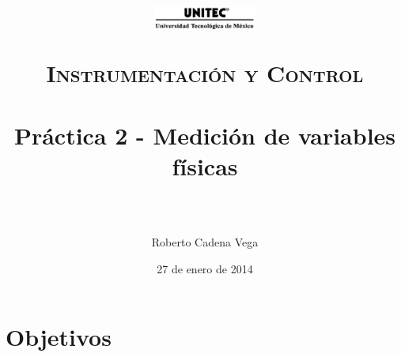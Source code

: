 



\title{	
	\normalfont \normalsize
	\begin{figure}[h]
		\begin{center}
			\includegraphics[width=0.3\textwidth]{../../images/UNITEC.png} %
		\end{center}
	\end{figure}
	\textsc{Instrumentación y Control} \\ [25pt]
	\horrule{0.5pt} \\[0.4cm] %
	\huge Práctica 2 - Medición de variables físicas \\ %
	\horrule{2pt} \\[0.5cm] %
}

\author{Roberto Cadena Vega} %

\date{\normalsize 27 de enero de 2014} %




\maketitle %


\section{Objetivos}

